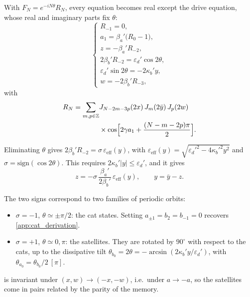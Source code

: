 \documentclass[aps,prx,reprint,floatfix,amsmath,amssymb,longbibliography]{revtex4-2}
\begin{document}
With $F_N=e^{-iN\theta}R_N$, every equation becomes real except the drive equation, whose real and imaginary parts fix $\theta$:
\begin{equation}
\begin{cases}
    R_{-1} = 0,\\
    a_1 = \beta_a'\bigl(R_0-1\bigr),\\
    z = -\beta_a' R_{-2},\\
    2\beta_b' R_{-2} = \varepsilon_d'\cos2\theta,\\
    \varepsilon_d'\sin2\theta = -2\kappa_b' y,\\
    w = -2\beta_b' R_{-3},
\end{cases}
\label{eq:app_sat_bessel}
\end{equation}
with
\begin{equation}
\begin{split}
    R_N = \sum_{m,p\in\mathbb Z} &J_{N-2m-3p}(2x)\,J_m(2\bar y)\,J_p(2w)\\
    &\times\cos\Bigl[2\gamma a_1 + \frac{(N-m-2p)\pi}{2}\Bigr].
\end{split}
\label{eq:app_RN}
\end{equation}

Eliminating $\theta$ gives $2\beta_b'R_{-2}=\sigma\,\varepsilon_\text{eff}(y)$, with $\varepsilon_\text{eff}(y)=\sqrt{\varepsilon_d'^2-4\kappa_b'^2y^2}$ and $\sigma=\mathrm{sign}(\cos2\theta)$. This requires $2\kappa_b'|y|\le\varepsilon_d'$, and it gives
\begin{equation}
    z = -\sigma\,\frac{\beta_a'}{2\beta_b'}\,\varepsilon_\text{eff}(y),
    \qquad y = \bar y - z .
    \label{eq:app_z}
\end{equation}

The two signs correspond to two families of periodic orbits:
\begin{itemize}
    \item $\sigma=-1$, $\theta\simeq\pm\pi/2$: the cat states. Setting $a_{\pm1}=b_2=b_{-1}=0$ recovers \cref{app:cat_derivation}.
    \item $\sigma=+1$, $\theta\simeq0,\pi$: the satellites. They are rotated by $90^\circ$ with respect to the cats, up to the dissipative tilt $\theta_{b_0}=2\theta=-\arcsin(2\kappa_b' y/\varepsilon_d')$, with $\theta_{a_0}=\theta_{b_0}/2 \ [\pi]$.
\end{itemize}
 is invariant under $(x,w)\to(-x,-w)$, i.e.\ under $a\to-a$, so the satellites come in pairs related by the parity of the memory.
\end{document}
